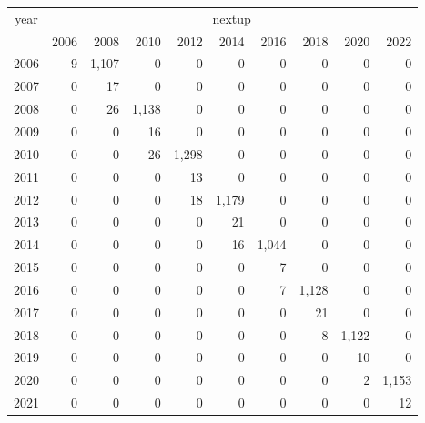 \footnotesize\begin{tabular}[t]{lrrrrrrrrr}
\toprule
\multicolumn{1}{c}{year} & \multicolumn{9}{c}{nextup} \\
\cmidrule(l{3pt}r{3pt}){1-1} \cmidrule(l{3pt}r{3pt}){2-10}
  & 2006 & 2008 & 2010 & 2012 & 2014 & 2016 & 2018 & 2020 & 2022\\
\midrule
2006 & 9 & 1,107 & 0 & 0 & 0 & 0 & 0 & 0 & 0\\
2007 & 0 & 17 & 0 & 0 & 0 & 0 & 0 & 0 & 0\\
2008 & 0 & 26 & 1,138 & 0 & 0 & 0 & 0 & 0 & 0\\
2009 & 0 & 0 & 16 & 0 & 0 & 0 & 0 & 0 & 0\\
2010 & 0 & 0 & 26 & 1,298 & 0 & 0 & 0 & 0 & 0\\
2011 & 0 & 0 & 0 & 13 & 0 & 0 & 0 & 0 & 0\\
2012 & 0 & 0 & 0 & 18 & 1,179 & 0 & 0 & 0 & 0\\
2013 & 0 & 0 & 0 & 0 & 21 & 0 & 0 & 0 & 0\\
2014 & 0 & 0 & 0 & 0 & 16 & 1,044 & 0 & 0 & 0\\
2015 & 0 & 0 & 0 & 0 & 0 & 7 & 0 & 0 & 0\\
2016 & 0 & 0 & 0 & 0 & 0 & 7 & 1,128 & 0 & 0\\
2017 & 0 & 0 & 0 & 0 & 0 & 0 & 21 & 0 & 0\\
2018 & 0 & 0 & 0 & 0 & 0 & 0 & 8 & 1,122 & 0\\
2019 & 0 & 0 & 0 & 0 & 0 & 0 & 0 & 10 & 0\\
2020 & 0 & 0 & 0 & 0 & 0 & 0 & 0 & 2 & 1,153\\
2021 & 0 & 0 & 0 & 0 & 0 & 0 & 0 & 0 & 12\\
\bottomrule
\end{tabular}
